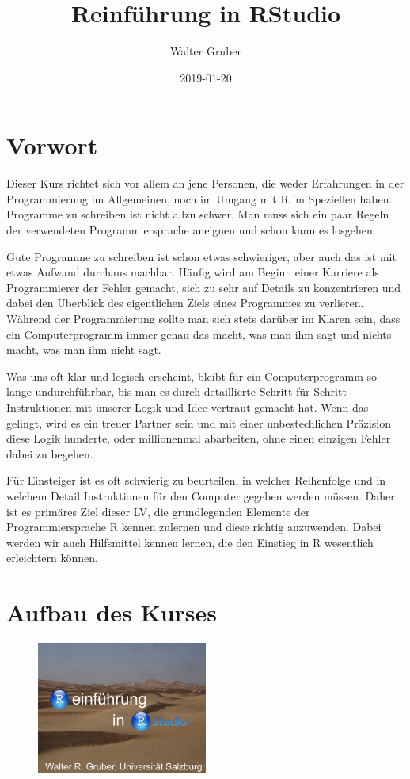 \documentclass[]{article}
\title{Reinführung in RStudio}
\author{Walter Gruber}
\date{2019-01-20}
\begin{document}
\maketitle

{
\setcounter{tocdepth}{2}
\tableofcontents
}
\section*{Vorwort}\label{vorwort}

Dieser Kurs richtet sich vor allem an jene Personen, die weder
Erfahrungen in der Programmierung im Allgemeinen, noch im Umgang mit R
im Speziellen haben. Programme zu schreiben ist nicht allzu schwer. Man
muss sich ein paar Regeln der verwendeten Programmiersprache aneignen
und schon kann es losgehen.

Gute Programme zu schreiben ist schon etwas schwieriger, aber auch das
ist mit etwas Aufwand durchaus machbar. Häufig wird am Beginn einer
Karriere als Programmierer der Fehler gemacht, sich zu sehr auf Details
zu konzentrieren und dabei den Überblick des eigentlichen Ziels eines
Programmes zu verlieren. Während der Programmierung sollte man sich
stets darüber im Klaren sein, dass ein Computerprogramm immer genau das
macht, was man ihm sagt und nichts macht, was man ihm nicht sagt.

Was uns oft klar und logisch erscheint, bleibt für ein Computerprogramm
so lange undurchführbar, bis man es durch detaillierte Schritt für
Schritt Instruktionen mit unserer Logik und Idee vertraut gemacht hat.
Wenn das gelingt, wird es ein treuer Partner sein und mit einer
unbestechlichen Präzision diese Logik hunderte, oder millionenmal
abarbeiten, ohne einen einzigen Fehler dabei zu begehen.

Für Einsteiger ist es oft schwierig zu beurteilen, in welcher
Reihenfolge und in welchem Detail Instruktionen für den Computer gegeben
werden müssen. Daher ist es primäres Ziel dieser LV, die grundlegenden
Elemente der Programmiersprache R kennen zulernen und diese richtig
anzuwenden. Dabei werden wir auch Hilfsmittel kennen lernen, die den
Einstieg in R wesentlich erleichtern können.

\section{Aufbau des Kurses}\label{aufbau-des-kurses}

\begin{figure}
\centering
\includegraphics[width=0.50000\textwidth]{Images/Cover.png}
\caption{}
\end{figure}
\end{document}
